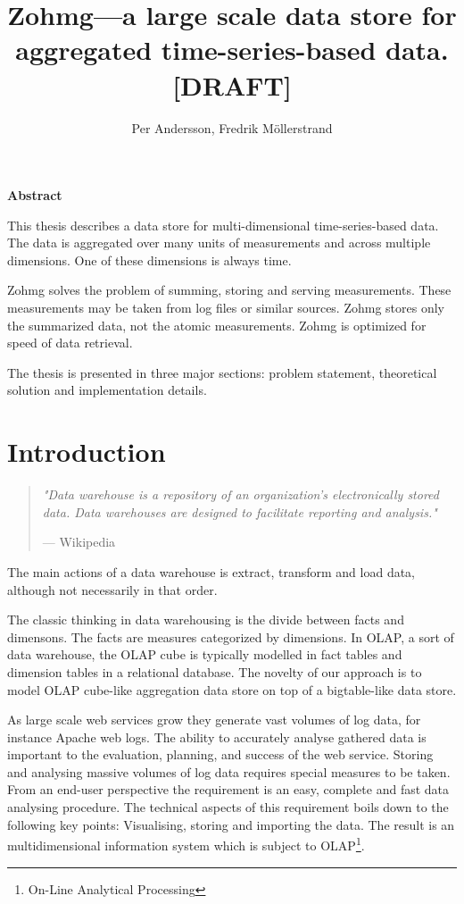 \documentclass[a4paper,10pt]{book}
\author{Per Andersson, Fredrik M{\"o}llerstrand}
\title{Zohmg---a large scale data store for aggregated time-series-based
data. [DRAFT]}
\newcommand{\chapterquote}[2] {
\begin{quote}
\textit{"{#1}"}

--- {#2}
\end{quote}

\vspace{24pt}
}
\begin{document}
\maketitle

\noindent \Large{\textbf{Abstract}}

\vspace{12pt}

\noindent 
This thesis describes a data store for multi-dimensional time-series-based data. The data is aggregated over many units of measurements and across multiple dimensions. One of these dimensions is always time.

Zohmg solves the problem of summing, storing and serving measurements. These measurements may be taken from log files or similar sources. Zohmg stores only the summarized data, not the atomic measurements. Zohmg is optimized for speed of data retrieval.

The thesis is presented in three major sections: problem statement, theoretical solution and implementation details.


\tableofcontents

\vfill

\pagebreak

\chapter{Introduction}


\chapterquote{Data warehouse is a repository of an organization's
electronically stored data. Data warehouses are designed to facilitate
reporting and analysis.}{Wikipedia}

The main actions of a data warehouse is extract, transform and load data,
although not necessarily in that order.

The classic thinking in data warehousing is the divide between facts and dimensons. The facts are measures categorized by dimensions. In OLAP, a sort of data warehouse, the OLAP cube is typically modelled in fact tables and dimension tables in a relational database. The novelty of our approach is to model OLAP cube-like aggregation data store on top of a bigtable-like data store.


As large scale web services grow they generate vast volumes of log data,
for instance Apache web logs. The ability to accurately analyse gathered
data is important to the evaluation, planning, and success of the web
service. Storing and analysing massive volumes of log data requires
special measures to be taken. From an end-user perspective the requirement
is an easy, complete and fast data analysing procedure. The technical
aspects of this requirement boils down to the following key points:
Visualising, storing and importing the data. The result is an
multidimensional information system which is subject to
OLAP\footnote{On-Line Analytical Processing}. \cite{olap_solutions}
\end{document}
